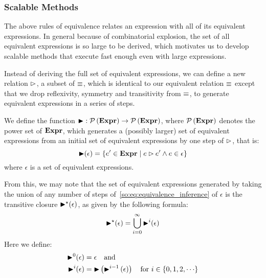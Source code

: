 \subsubsection{Scalable Methods}

The above rules of equivalence relates an expression with all of its equivalent
expressions.  In general because of combinatorial explosion, the set of all
equivalent expressions is so large to be derived, which motivates us to develop
scalable methods that execute fast enough even with large expressions.

Instead of deriving the full set of equivalent expressions, we can define a
new relation $\mathbin{\rhd}$, a subset of $\equiv$, which is identical to our
equivalent relation $\equiv$ except that we drop reflexivity, symmetry and
transitivity from $\equiv$, to generate equivalent expressions in a series of
steps.

We define the function $\operatorname{\blacktriangleright}: \mathcal{P}\left({\mathbf{Expr}}\right)\to\mathcal{P}\left({\mathbf{Expr}}\right)$,
where $\mathcal{P}\left({\mathbf{Expr}}\right)$ denotes the power set of $\mathbf{Expr}$, which
generates a (possibly larger) set of equivalent expressions from an initial set
of equivalent expressions by one step of $\mathbin{\rhd}$, that is:
\begin{equation}
    \operatorname{\blacktriangleright}(\epsilon) = \left\{
        e^\prime\in\mathbf{Expr} \mid
        e \mathbin{\rhd} e^\prime \wedge e\in\epsilon\right\}
\end{equation}
where $\epsilon$ is a set of equivalent expressions.

From this, we may note that the set of equivalent expressions generated by
taking the union of any number of steps of~\eqref{so:eq:equivalence_inference}
of $\epsilon$ is the transitive closure $\operatorname{\blacktriangleright}^\star(\epsilon)$, as given by
the following formula:
\begin{equation}
    \operatorname{\blacktriangleright}^\star(\epsilon) = \bigcup_{i = 0}^\infty \operatorname{\blacktriangleright}^i(\epsilon)
    \label{so:eq:transitive_closure}
\end{equation}
Here we define:
\begin{equation}
    \begin{aligned}
        \operatorname{\blacktriangleright}^0(\epsilon) &= \epsilon \quad \text{and~} \\
        \operatorname{\blacktriangleright}^i(\epsilon) &= \operatorname{\blacktriangleright}\left(
            \operatorname{\blacktriangleright}^{i - 1}\left(\epsilon\right)
        \right) \quad \text{for~} i \in \{ 0, 1, 2, \cdots \}
    \end{aligned}
\end{equation}


